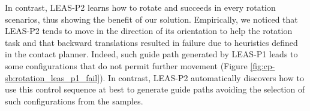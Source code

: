 In contrast, LEAS-P2 learns how to rotate and succeeds in every rotation scenarios, thus showing the benefit of our solution.
Empirically, we noticed that LEAS-P2 tends to move in the direction of its orientation to help the rotation task and that backward translations resulted in failure due to heuristics defined in the contact planner.
Indeed, such guide path generated by LEAS-P1 leads to some configurations that do not permit further movement (Figure \ref{fig:cp-sb:rotation_leas_p1_fail}). 
In contrast, LEAS-P2 automatically discovers how to use this control sequence at best to generate guide paths avoiding the selection of such configurations from the samples.


